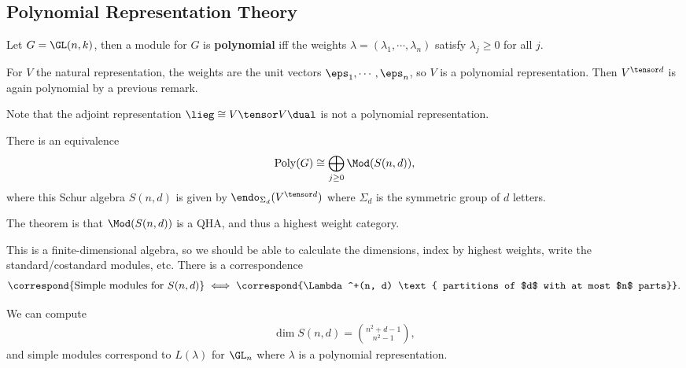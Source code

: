 \hypertarget{polynomial-representation-theory}{%
\subsection{Polynomial Representation
Theory}\label{polynomial-representation-theory}}

Let \(G = \GL(n, k)\), then a module for \(G\) is \textbf{polynomial}
iff the weights \(\lambda = (\lambda_1, \cdots, \lambda_n)\) satisfy
\(\lambda_j \geq 0\) for all \(j\).

\begin{example}

For \(V\) the natural representation, the weights are the unit vectors
\(\eps_1, \cdots, \eps_n\), so \(V\) is a polynomial representation.
Then \(V^{\tensor d}\) is again polynomial by a previous remark.

\end{example}

\begin{remark}

Note that the adjoint representation \(\lieg \cong V\tensor V\dual\) is
not a polynomial representation.

\end{remark}

\begin{theorem}[?]

There is an equivalence
\begin{align*}  
\mathrm{Poly}(G) \cong \bigoplus_{j\geq 0} \Mod(S(n, d))
,\end{align*} where this Schur algebra \(S(n, d)\) is given by
\(\endo_{\Sigma_d}(V^{\tensor d})\) where \(\Sigma_d\) is the symmetric
group of \(d\) letters.

The theorem is that \(\Mod(S(n, d))\) is a QHA, and thus a highest
weight category.

\end{theorem}

\begin{remark}

This is a finite-dimensional algebra, so we should be able to calculate
the dimensions, index by highest weights, write the standard/costandard
modules, etc. There is a correspondence
\begin{align*} 
\correspond{\text{Simple modules for }S(n, d)}
\iff
\correspond{\Lambda^+(n, d) \text{ partitions of $d$ with at most $n$ parts}}
.\end{align*}

We can compute
\begin{align*}  
\dim S(n, d) = {n^2 + d - 1 \choose n^2 - 1}
,\end{align*} and simple modules correspond to \(L(\lambda)\) for
\(\GL_n\) where \(\lambda\) is a polynomial representation.

\end{remark}

